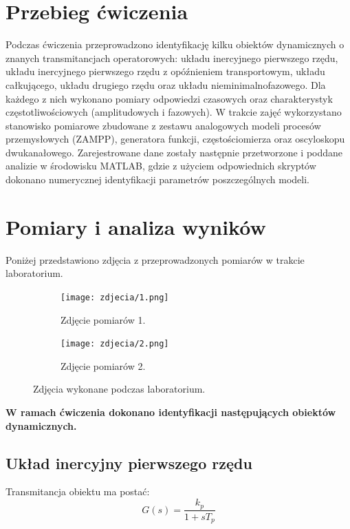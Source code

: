 \documentclass[12pt,a4paper]{article}
\begin{document}
	\section{Przebieg ćwiczenia}
	Podczas ćwiczenia przeprowadzono identyfikację kilku obiektów dynamicznych o znanych transmitancjach operatorowych: układu inercyjnego pierwszego rzędu, układu inercyjnego pierwszego rzędu z opóźnieniem transportowym, układu całkującego, układu drugiego rzędu oraz układu nieminimalnofazowego. Dla każdego z nich wykonano pomiary odpowiedzi czasowych oraz charakterystyk częstotliwościowych (amplitudowych i fazowych). W trakcie zajęć wykorzystano stanowisko pomiarowe zbudowane z zestawu analogowych modeli procesów przemysłowych (ZAMPP), generatora funkcji, częstościomierza oraz oscyloskopu dwukanałowego. Zarejestrowane dane zostały następnie przetworzone i poddane analizie w środowisku MATLAB, gdzie z użyciem odpowiednich skryptów dokonano numerycznej identyfikacji parametrów poszczególnych modeli.
	
	\newpage
	\section{Pomiary i analiza wyników}
	Poniżej przedstawiono zdjęcia z przeprowadzonych pomiarów w trakcie laboratorium.
	
	\begin{figure}[H]
		\centering
		\begin{subfigure}[b]{0.48\textwidth}
			\centering
			\texttt{[image: zdjecia/1.png]}
			\caption{Zdjęcie pomiarów 1.}
			\label{fig:pomiar1}
		\end{subfigure}
		\hfill
		\begin{subfigure}[b]{0.48\textwidth}
			\centering
			\texttt{[image: zdjecia/2.png]}
			\caption{Zdjęcie pomiarów 2.}
			\label{fig:pomiar2}
		\end{subfigure}
		\caption{Zdjęcia wykonane podczas laboratorium.}
	\end{figure}
	
	\textbf{W ramach ćwiczenia dokonano identyfikacji następujących obiektów dynamicznych.}
	
	\subsection{Układ inercyjny pierwszego rzędu}
	
	Transmitancja obiektu ma postać:
	\begin{equation}
		G(s) = \frac{k_p}{1 + sT_p}
	\end{equation}
	
\end{document}
